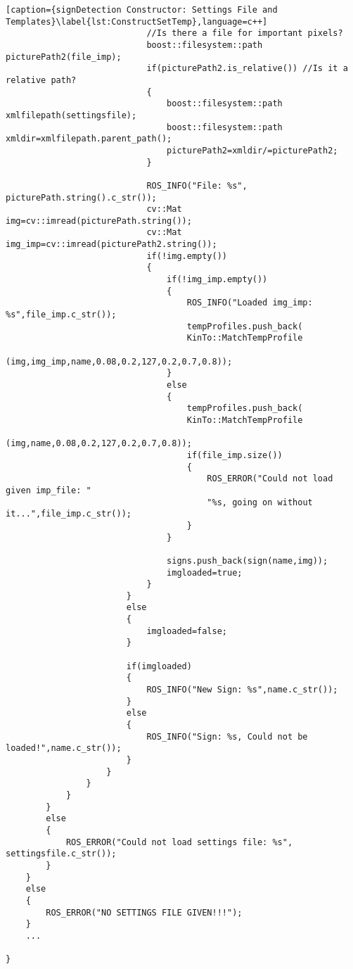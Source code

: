 \begin{lstlisting}[caption={signDetection Constructor: Settings File and Templates}\label{lst:ConstructSetTemp},language=c++]
							//Is there a file for important pixels?
							boost::filesystem::path picturePath2(file_imp);
							if(picturePath2.is_relative()) //Is it a relative path?
							{
								boost::filesystem::path xmlfilepath(settingsfile);
								boost::filesystem::path xmldir=xmlfilepath.parent_path();
								picturePath2=xmldir/=picturePath2;
							}

							ROS_INFO("File: %s", picturePath.string().c_str());
							cv::Mat img=cv::imread(picturePath.string());
							cv::Mat img_imp=cv::imread(picturePath2.string());
							if(!img.empty())
							{
								if(!img_imp.empty())
								{
									ROS_INFO("Loaded img_imp: %s",file_imp.c_str());
									tempProfiles.push_back(
									KinTo::MatchTempProfile
									(img,img_imp,name,0.08,0.2,127,0.2,0.7,0.8));
								}
								else
								{
									tempProfiles.push_back(
									KinTo::MatchTempProfile
									(img,name,0.08,0.2,127,0.2,0.7,0.8));
									if(file_imp.size())
									{
										ROS_ERROR("Could not load given imp_file: "
										"%s, going on without it...",file_imp.c_str());
									}
								}

								signs.push_back(sign(name,img));
								imgloaded=true;
							}
						}
						else
						{
							imgloaded=false;
						}

						if(imgloaded)
						{
							ROS_INFO("New Sign: %s",name.c_str());
						}
						else
						{
							ROS_INFO("Sign: %s, Could not be loaded!",name.c_str());
						}
					}
				}
			}
		}
		else
		{
			ROS_ERROR("Could not load settings file: %s", settingsfile.c_str());
		}
	}
	else
	{
		ROS_ERROR("NO SETTINGS FILE GIVEN!!!");
	}
	...

}
\end{lstlisting}



